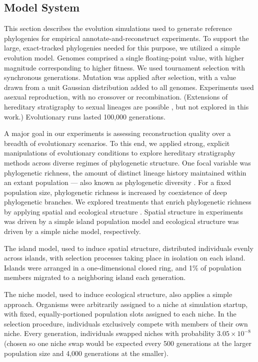 \subsection{Model System}

This section describes the evolution simulations used to generate reference phylogenies for empirical annotate-and-reconstruct experiments.
To support the large, exact-tracked phylogenies needed for this purpose, we utilized a simple evolution model.
Genomes comprised a single floating-point value, with higher magnitude corresponding to higher fitness.
We used tournament selection with synchronous generations.
Mutation was applied after selection, with a value drawn from a unit Gaussian distribution added to all genomes.
Experiments used asexual reproduction, with no crossover or recombination.
(Extensions of hereditary stratigraphy to sexual lineages are possible \citep{moreno2024methods}, but not explored in this work.)
Evolutionary runs lasted 100,000 generations.

A major goal in our experiments is assessing reconstruction quality over a breadth of evolutionary scenarios.
To this end, we applied strong, explicit manipulations of evolutionary conditions to explore hereditary stratigraphy methods across diverse regimes of phylogenetic structure.
One focal variable was phylogenetic richness, the amount of distinct lineage history maintained within an extant population --- also known as phylogenetic diversity \citep{tucker2017guide}.
For a fixed population size, phylogenetic richness is increased by coexistence of deep phylogenetic branches.
We explored treatments that enrich phylogenetic richness by applying spatial and ecological structure \citep{moreno2024ecology,gomez2019understanding,valiente2007facilitation}.
Spatial structure in experiments was driven by a simple island population model and ecological structure was driven by a simple niche model, respectively.

The island model, used to induce spatial structure, distributed individuals evenly across islands, with selection processes taking place in isolation on each island.
Islands were arranged in a one-dimensional closed ring, and 1\% of population members migrated to a neighboring island each generation.

The niche model, used to induce ecological structure, also applies a simple approach.
Organisms were arbitrarily assigned to a niche at simulation startup, with fixed, equally-portioned population slots assigned to each niche.
In the selection procedure, individuals exclusively compete with members of their own niche.
Every generation, individuals swapped niches with probability $3.05 \times 10^{-8}$ (chosen so one niche swap would be expected every 500 generations at the larger population size and 4,000 generations at the smaller).

